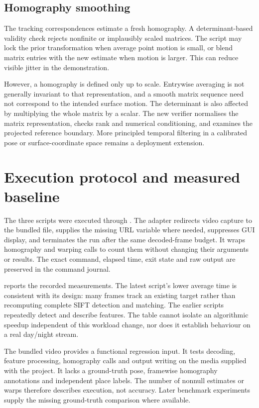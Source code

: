 \subsection{Homography smoothing}
The tracking correspondences estimate a fresh homography. A determinant-based validity check rejects nonfinite or implausibly scaled matrices. The script may lock the prior transformation when average point motion is small, or blend matrix entries with the new estimate when motion is larger. This can reduce visible jitter in the demonstration.

However, a homography is defined only up to scale. Entrywise averaging is not generally invariant to that representation, and a smooth matrix sequence need not correspond to the intended surface motion. The determinant is also affected by multiplying the whole matrix by a scalar. The new verifier normalises the matrix representation, checks rank and numerical conditioning, and examines the projected reference boundary. More principled temporal filtering in a calibrated pose or surface-coordinate space remains a deployment extension.

\section{Execution protocol and measured baseline}
The three scripts were executed through . The adapter redirects video capture to the bundled file, supplies the missing URL variable where needed, suppresses GUI display, and terminates the run after the same decoded-frame budget. It wraps homography and warping calls to count them without changing their arguments or results. The exact command, elapsed time, exit state and raw output are preserved in the command journal.

 reports the recorded measurements. The latest script's lower average time is consistent with its design: many frames track an existing target rather than recomputing complete SIFT detection and matching. The earlier scripts repeatedly detect and describe features. The table cannot isolate an algorithmic speedup independent of this workload change, nor does it establish behaviour on a real day/night stream.

The bundled video provides a functional regression input. It tests decoding, feature processing, homography calls and output writing on the media supplied with the project. It lacks a ground-truth pose, framewise homography annotations and independent place labels. The number of nonnull estimates or warps therefore describes execution, not accuracy. Later benchmark experiments supply the missing ground-truth comparison where available.

